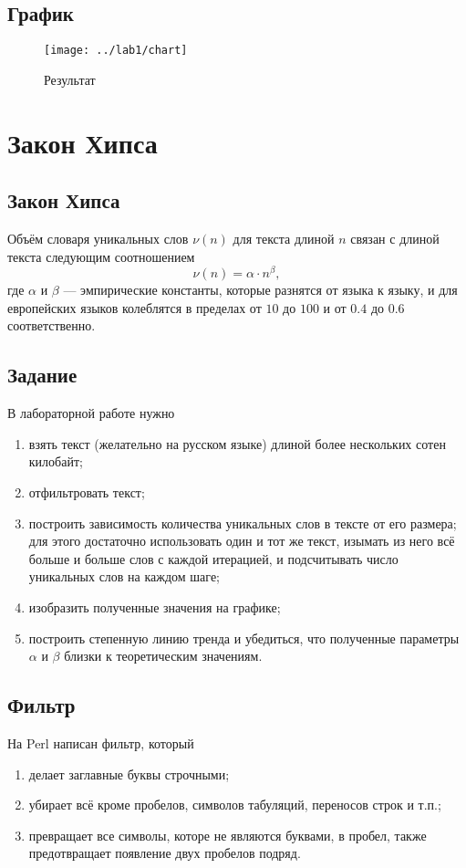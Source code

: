 \section{График}
\begin{figure}[h]
  \centering
  \texttt{[image: ../lab1/chart]}
  \caption{Результат}
\end{figure}

\chapter{Закон Хипса}

\section{Закон Хипса}
Объём словаря уникальных слов $\nu\left( n \right)$
для текста длиной $n$ связан с длиной текста следующим соотношением
\cite{Internetika}
\begin{equation*}
  \nu\left( n \right) = \alpha \cdot n^\beta,
\end{equation*}
где $\alpha$ и $\beta$ --- эмпирические константы,
которые разнятся от языка к языку,
и для европейских языков колеблятся в пределах
от $10$ до $100$ и от $0.4$ до $0.6$ соответственно.

\section{Задание}
В лабораторной работе нужно
\begin{enumerate}
  \item
    взять текст (желательно на русском языке)
    длиной более нескольких сотен килобайт;
  \item
    отфильтровать текст;
  \item
    построить зависимость количества уникальных слов в тексте
    от его размера; для этого достаточно использовать один и тот же текст,
    изымать из него всё больше и больше слов с каждой итерацией,
    и подсчитывать число уникальных слов на каждом шаге;
  \item
    изобразить полученные значения на графике;
  \item
    построить степенную линию тренда и убедиться,
    что полученные параметры $\alpha$ и $\beta$ близки к
    теоретическим значениям.
\end{enumerate}

\section{Фильтр}
На Perl написан фильтр, который
\begin{enumerate}
  \item делает заглавные буквы строчными;
  \item убирает всё кроме пробелов, символов табуляций, переносов строк и т.п.;
  \item превращает все символы, которе не являются буквами, в пробел, также
    предотвращает появление двух пробелов подряд.
\end{enumerate}

